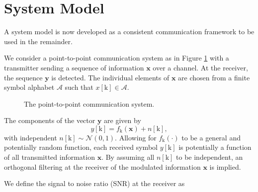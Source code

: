 \par

\section{System Model}

A system model is now developed as a consistent communication framework to be used in the remainder.
\par
We consider a point-to-point communication system as in Figure \ref{fig:model} with a transmitter sending a sequence of information $\mathbf{x}$ over a channel. At the receiver, the sequence  $\mathbf{y}$ is detected. 
The individual elements of $\mathbf{x}$ are chosen from a finite symbol alphabet $\mathcal{A}$ such that $x[\text{k}] \in \mathcal{A}$.

\begin{figure}[H]
\caption{The point-to-point communication system.}
\label{fig:model}
\end{figure}

The components of the vector $\mathbf{y}$ are given by
\begin{equation*}
y[\text{k}] = f_{\text{k}}(\mathbf{x}) + n[\text{k}],
\end{equation*}
with independent $n[\text{k}]\sim \mathcal{N}(0,1).$
Allowing for $f_{\text{k}}(\cdot)$ to be a general and potentially random function, each received symbol $y[\text{k}]$ is potentially a function of all transmitted information $\mathbf{x}$. By assuming all $n[\text{k}]$ to be independent, an orthogonal filtering at the receiver of the modulated information $\mathbf{x}$ is implied. 

We define the signal to noise ratio (SNR) at the receiver as

